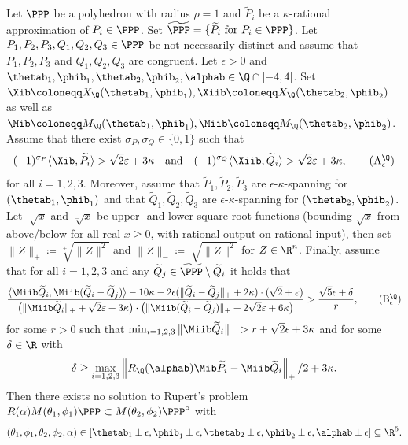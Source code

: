 \begin{theorem}
\label{thm:local_rational}
\leanok
{}
    Let $\PPP$ be a polyhedron with radius $\rho=1$ and $\widetilde{P}_i$ be a $\kappa$-rational approximation of $P_i \in \PPP$. Set $\widetilde{\PPP} = \{\widetilde{P}_i \text{ for } P_i \in \PPP \}$. Let $P_1, P_2, P_3, Q_1, Q_2, Q_3 \in \PPP$ be not necessarily distinct and assume that $P_1, P_2, P_3$ and $Q_1, Q_2, Q_3$ are congruent.
    Let $\epsilon>0$ and $\thetab_1,\phib_1,\thetab_2,\phib_2,\alphab \in \Q \cap [-4,4]$.
    Set $\Xib \coloneqq X_{\Q}(\thetab_1,\phib_1), \Xiib \coloneqq X_{\Q}(\thetab_2,\phib_2)$ as well as $\Mib \coloneqq M_{\Q}(\thetab_1,\phib_1), \Miib \coloneqq M_{\Q}(\thetab_2,\phib_2)$.
    Assume that there exist $\sigma_P, \sigma_Q \in \{0,1\}$ such that
    \[
        (-1)^{\sigma_P} \langle \Xib,\widetilde{P}_i\rangle>\sqrt{2}\varepsilon + 3\kappa \quad \text{and} \quad
        (-1)^{\sigma_Q} \langle \Xiib , \widetilde{Q}_i\rangle>\sqrt{2}\varepsilon + 3\kappa, \tag{A$^{\Q}_\epsilon$}
    \]
    for all $i=1,2,3$.
    Moreover, assume that $\widetilde{P}_1,\widetilde{P}_2,\widetilde{P}_3$ are $\epsilon$-$\kappa$-spanning for $(\thetab_1,\phib_1)$ and that $\widetilde{Q}_1,\widetilde{Q}_2,\widetilde{Q}_3$ are $\epsilon$-$\kappa$-spanning for $(\thetab_2,\phib_2)$. Let $\sqrt[+]{x}$ and $\sqrt[-]{x}$ be upper- and lower-square-root functions (bounding $\sqrt{x}$ from above/below for all real $x \geq 0$, with rational output on rational input), then set $\|Z\|_{+} \coloneqq \sqrt[+]{\|Z\|^2}$ and $\|Z\|_{-} \coloneqq \sqrt[-]{\|Z\|^2}$ for $Z \in \R^n$.
    Finally, assume that for all $i = 1,2,3$ and any $\widetilde{Q}_j \in \widetilde{\PPP} \setminus \widetilde{Q}_i$ it holds that
    \[
        \frac{\langle \Miib \widetilde{Q}_i,\Miib (\widetilde{Q}_i-\widetilde{Q}_j)\rangle - 10\kappa - 2 \epsilon ( \|\widetilde{Q}_i-\widetilde{Q}_j\|_{+} + 2 \kappa ) \cdot  (\sqrt{2}+\varepsilon)}{ \big(\|\Miib \widetilde{Q}_i\|_{+}+\sqrt{2} \varepsilon + 3\kappa \big) \cdot \big(\|\Miib(\widetilde{Q}_i-\widetilde{Q}_j)\|_{+}+2 \sqrt{2} \varepsilon + 6\kappa\big)} > \frac{\sqrt{5} \epsilon + \delta}{r}, \tag{B$^{\Q}_\epsilon$}
    \]
    for some $r >0$ such that $\min_{i=1,2,3}\| \Miib \widetilde{Q}_i \|_{-} > r + \sqrt{2} \epsilon + 3\kappa$ and for some $\delta \in \R$ with
    \[
        \delta \geq \max_{i=1,2,3}\left\|R_{\Q}(\alphab) \Mib \widetilde{P}_i-\Miib \widetilde{Q}_i\right\|_{+}/2 + 3\kappa.
    \]
    Then there exists no solution to Rupert's problem $R(\alpha) M(\theta_1,\phi_1)\PPP \subset  M(\theta_2,\phi_2)\PPP^\circ$ with
    \[
        (\theta_1, \phi_1, \theta_2, \phi_2, \alpha) \in [\thetab_1\pm\epsilon,\phib_1\pm\epsilon,\thetab_2\pm\epsilon,\phib_2\pm\epsilon,\alphab\pm\epsilon] \subseteq \R^5.
    \]


\end{theorem}
